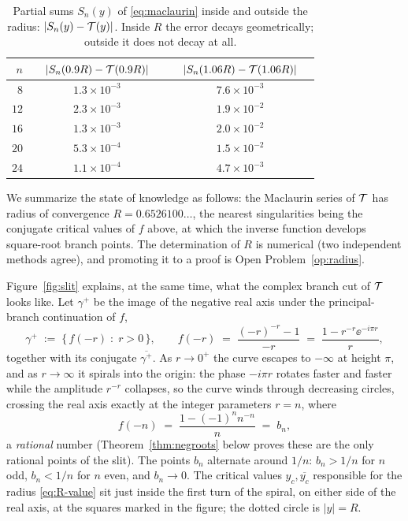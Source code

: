 \begin{table}[t]
\centering
\caption{Partial sums $S_{n}(y)$ of \eqref{eq:maclaurin} inside and
outside the radius: $|S_{n}(y) - \mathcal{T}(y)|$. Inside $R$ the error decays
geometrically; outside it does not decay at all.}
\label{tab:partials}
\begin{tabular}{rcc}
\toprule
$n$ & $\quad |S_{n}(0.9R) - \mathcal{T}(0.9R)|\quad$ & $\quad |S_{n}(1.06R) - \mathcal{T}(1.06R)|\quad$ \\
\midrule
$8$  & $1.3 \times 10^{-3}$ & $7.6 \times 10^{-3}$ \\
$12$ & $2.3 \times 10^{-3}$ & $1.9 \times 10^{-2}$ \\
$16$ & $1.3 \times 10^{-3}$ & $2.0 \times 10^{-2}$ \\
$20$ & $5.3 \times 10^{-4}$ & $1.5 \times 10^{-2}$ \\
$24$ & $1.1 \times 10^{-4}$ & $4.7 \times 10^{-3}$ \\
\bottomrule
\end{tabular}
\end{table}

We summarize the state of knowledge as follows: the Maclaurin series of
$\mathcal{T}$ has radius of convergence $R = 0.6526100\ldots$, the nearest
singularities being the conjugate critical values of $f$ above, at
which the inverse function develops square-root branch points. The
determination of $R$ is numerical (two independent methods agree), and
promoting it to a proof is Open Problem~\ref{op:radius}.

Figure~\ref{fig:slit} explains, at the same time, what the complex
branch cut of $\mathcal{T}$ looks like. Let $\gamma^{+}$ be the image of the
negative real axis under the principal-branch continuation of $f$,
\[
    \gamma^{+} \;:=\; \bigl\{\, f(-r) \;:\; r > 0 \,\bigr\},
    \qquad
    f(-r) \;=\; \frac{(-r)^{-r} - 1}{-r}
    \;=\; \frac{1 - r^{-r}\ee^{-i\pi r}}{r} ,
\]
together with its conjugate $\overline{\gamma^{+}}$. As
$r \to 0^{+}$ the curve escapes to $-\infty$ at height $\pi$, and as
$r \to \infty$ it spirals into the origin: the phase $-i\pi r$ rotates
faster and faster while the amplitude $r^{-r}$ collapses, so the curve
winds through decreasing circles, crossing the real axis exactly at
the integer parameters $r = n$, where
\begin{equation}\label{eq:bn-on-slit}
    f(-n) \;=\; \frac{1 - (-1)^{n} n^{-n}}{n} \;=\; b_{n},
\end{equation}
a \emph{rational} number (Theorem~\ref{thm:negroots} below proves these
are the only rational points of the slit). The points $b_n$ alternate
around $1/n$: $b_n > 1/n$ for $n$ odd, $b_n < 1/n$ for $n$ even, and
$b_{n} \to 0$. The critical values $y_{c}, \overline{y_{c}}$ responsible
for the radius \eqref{eq:R-value} sit just inside the first turn of the
spiral, on either side of the real axis, at the squares marked in the
figure; the dotted circle is $|y| = R$.

